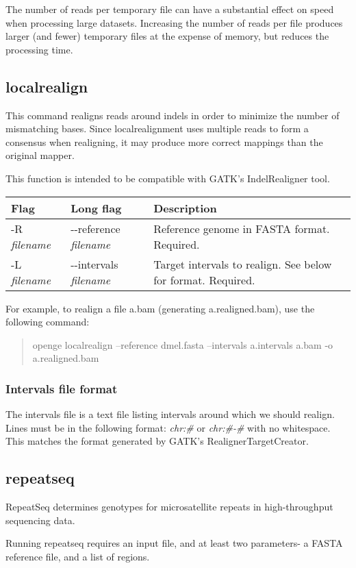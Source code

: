 \documentclass[11pt]{article}
\newcommand {\cmd}[1] {\begin{quote}#1\end{quote}}
\begin{document}
The number of reads per temporary file can have a substantial effect on speed when processing large datasets. Increasing the number of reads per file produces larger (and fewer) temporary files at the expense of memory, but reduces the processing time.

\subsection {localrealign}
This command realigns reads around indels in order to minimize the number of mismatching bases. Since localrealignment uses multiple reads to form a consensus when realigning, it may produce more correct mappings than the original mapper.

This function is intended to be compatible with GATK's IndelRealigner tool.
\begin{center}
\begin{tabular}{llp{3.5in}}
\hline
Flag&Long flag&Description\\ \hline
-R \textit{filename}&{-}{-}reference \textit{filename}&Reference genome in FASTA format. Required.\\
-L \textit{filename}&{-}{-}intervals \textit{filename}&Target intervals to realign. See below for format. Required.\\
\end{tabular}
\end{center}

For example, to realign a file a.bam (generating a.realigned.bam), use the following command:
\cmd{openge localrealign --reference dmel.fasta --intervals a.intervals a.bam -o a.realigned.bam}

\subsubsection {Intervals file format}
The intervals file is a text file listing intervals around which we should realign. Lines must be in the following format:
\textit{chr:\#} or \textit{chr:\#-\#} with no whitespace. This matches the format generated by GATK's RealignerTargetCreator.

\subsection{repeatseq}
RepeatSeq determines genotypes for microsatellite repeats in high-throughput sequencing data. 

Running repeatseq requires an input file, and at least two parameters- a FASTA reference file, and a list of regions.
\end{document}
